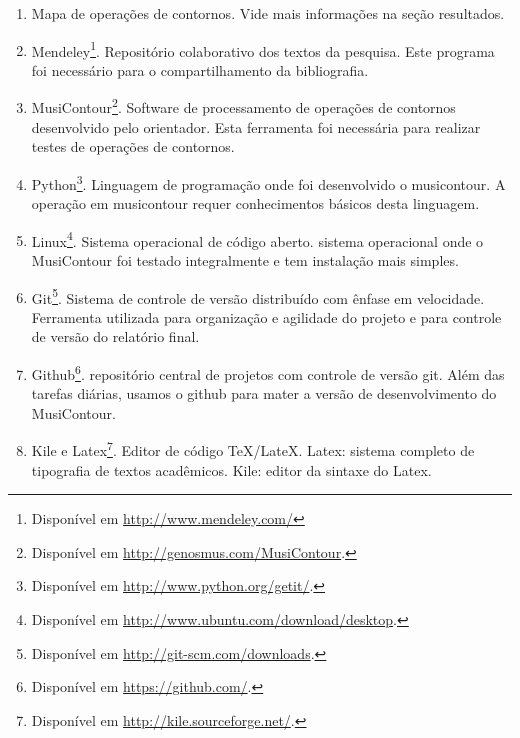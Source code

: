 \documentclass[11pt]{article}
\begin{document}
\begin{enumerate}
\item Mapa de operações de contornos. Vide mais
  informações na seção resultados.
\item Mendeley\footnote{Disponível em
    \url{http://www.mendeley.com/}}. Repositório colaborativo dos
  textos da pesquisa. Este programa foi necessário para o
  compartilhamento da bibliografia.
\item MusiContour\footnote{Disponível em
    \url{http://genosmus.com/MusiContour}.}. Software de processamento
  de operações de contornos desenvolvido pelo orientador. Esta
  ferramenta foi necessária para realizar testes de operações de
  contornos.
\item Python\footnote{Disponível em
  \url{http://www.python.org/getit/}.}. Linguagem de programação onde foi 
  desenvolvido o musicontour. A operação em musicontour requer conhecimentos
  básicos desta linguagem.
\item Linux\footnote{Disponível em
  \url{http://www.ubuntu.com/download/desktop}.}. Sistema operacional
  de código aberto. sistema operacional onde o MusiContour foi testado
 integralmente e tem instalação mais simples.
\item Git\footnote{Disponível em
  \url{http://git-scm.com/downloads}.}. Sistema de controle de versão
distribuído com ênfase em velocidade. Ferramenta utilizada para organização
e agilidade do projeto e para controle de versão do relatório final.
\item Github\footnote{Disponível em
  \url{https://github.com/}.}. repositório central de projetos com controle 
  de versão git. Além das tarefas diárias, usamos o github para mater a versão
  de desenvolvimento do MusiContour.
\item Kile e Latex\footnote{Disponível em
  \url{http://kile.sourceforge.net/}.}. Editor de código
TeX/LateX. Latex: sistema completo de tipografia de textos acadêmicos. Kile: editor da
sintaxe do Latex.
\end{enumerate}
\end{document}
